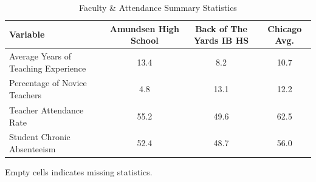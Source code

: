 \begin{table}[H]
\renewcommand{\arraystretch}{1.5}
\caption*{
{\large Faculty \& Attendance Summary Statistics}
} 

\fontsize{10pt}{11pt}\selectfont

\begin{tabular*}{\linewidth}{@{\extracolsep{\fill}}lccc}
\toprule
Variable & Amundsen High School & Back of The Yards IB HS & Chicago Avg. \\ 
\midrule\addlinespace[2.5pt]
Average Years of Teaching Experience & 13.4 & 8.2 & 10.7 \\
Percentage of Novice Teachers & 4.8 & 13.1 & 12.2 \\
Teacher Attendance Rate & 55.2 & 49.6 & 62.5 \\
Student Chronic Absenteeism & 52.4 & 48.7 & 56.0 \\
\bottomrule
\end{tabular*}
\begin{minipage}{\linewidth}
Empty cells indicates missing statistics.\\
\end{minipage}
\end{table}
